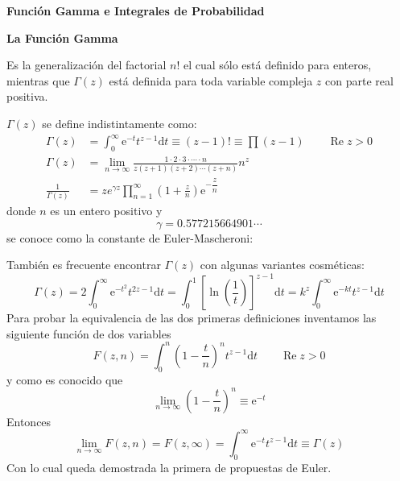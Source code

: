 \documentclass[spanish,notitlepage,letterpaper,12pt]{article}
\begin{document}
\title{ }



\begin{center}
\textbf{Funci\'{o}n Gamma e Integrales de Probabilidad}

\textbf{La Funci\'{o}n Gamma}
\end{center}

Es la generalizaci\'{o}n del factorial $n!$ el cual s\'{o}lo est\'{a} definido
para enteros, mientras que $\Gamma\left(  z\right)  $ est\'{a} definida para
toda variable compleja $z$ con parte real positiva.

$\Gamma\left(  z\right)  $ se define indistintamente como:
\begin{align*}
\Gamma\left(  z\right)   & =\int_{0}^{\infty}\mathrm{e}^{-t}t^{z-1}%
\mathrm{d}t\equiv\left(  z-1\right)  !\equiv\prod(z-1)\qquad\operatorname{Re}%
z>0\\
\Gamma\left(  z\right)   & =\lim_{n\rightarrow\infty}\frac{1\cdot2\cdot
3\cdot\cdots\cdot n}{z\left(  z+1\right)  \left(  z+2\right)  \cdots\left(
z+n\right)  }n^{z}\\
\frac1{\Gamma\left(  z\right)  }  & =ze^{\gamma z}\prod_{n=1}^{\infty}\left(
1+\frac zn\right)  \mathrm{e}^{-\dfrac zn}%
\end{align*}
donde $n$ es un entero positivo y
\[
\gamma=0.577215664901\cdots
\]
se conoce como la constante de Euler-Mascheroni:

Tambi\'{e}n es frecuente encontrar $\Gamma\left(  z\right)  $ con algunas
variantes cosm\'{e}ticas:
\[
\Gamma\left(  z\right)  =2\int_{0}^{\infty}\mathrm{e}^{-t^{2}}t^{2z-1}%
\mathrm{d}t=\int_{0}^{1}\left[  \ln\left(  \frac1t\right)  \right]
^{z-1}\mathrm{d}t=k^{z}\int_{0}^{\infty}\mathrm{e}^{-kt}t^{z-1}\mathrm{d}t
\]
Para probar la equivalencia de las dos primeras definiciones inventamos las
siguiente funci\'{o}n de dos variables
\[
F(z,n)=\int_{0}^{n}\left(  1-\frac tn\right)  ^{n}t^{z-1}\mathrm{d}%
t\qquad\operatorname{Re}z>0
\]
y como es conocido que
\[
\lim_{n\rightarrow\infty}\left(  1-\frac tn\right)  ^{n}\equiv\mathrm{e}^{-t}
\]
Entonces
\[
\lim_{n\rightarrow\infty}F(z,n)=F(z,\infty)=\int_{0}^{\infty}\mathrm{e}%
^{-t}t^{z-1}\mathrm{d}t\equiv\Gamma\left(  z\right)
\]
Con lo cual queda demostrada la primera de propuestas de Euler.
\end{document}
